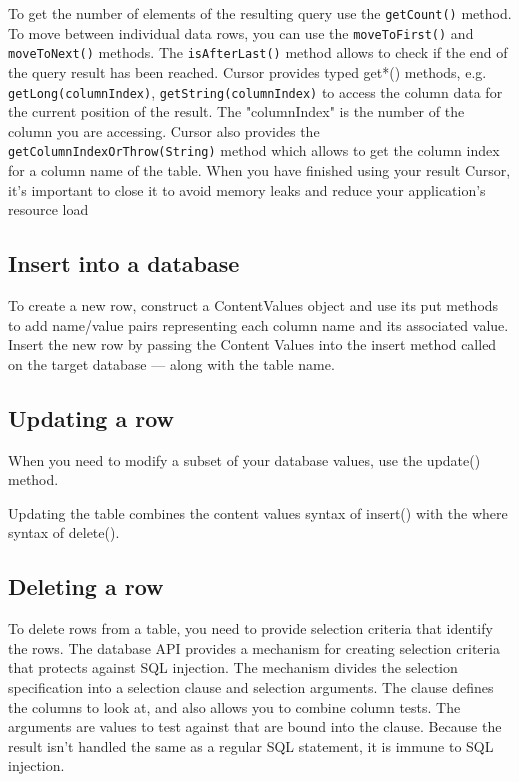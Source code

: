 To get the number of elements of the resulting query use the \texttt{getCount()} method.
To move between individual data rows, you can use the \texttt{moveToFirst()} and \texttt{moveToNext()} methods. The \texttt{isAfterLast()} method allows to check if the end of the query result has been reached.
Cursor provides typed get*() methods, e.g. \texttt{getLong(columnIndex)}, \texttt{getString(columnIndex)} to access the column data for the current position of the result. The "columnIndex" is the number of the column you are accessing.
Cursor also provides the \texttt{getColumnIndexOrThrow(String)} method which allows to get the column index for a column name of the table.
When you have finished using your result Cursor, it’s important to close it to avoid memory leaks and reduce your application’s resource load

\subsection{Insert into a database}
To create a new row, construct a ContentValues object and use its put methods to add name/value pairs representing each column name and its associated value. Insert the new row by passing the Content Values into the insert method called on the target database — along with the table name.

\subsection{Updating a row}
When you need to modify a subset of your database values, use the update() method.

Updating the table combines the content values syntax of insert() with the where syntax of delete().

\subsection{Deleting a row}
To delete rows from a table, you need to provide selection criteria that identify the rows. The database API provides a mechanism for creating selection criteria that protects against SQL injection. The mechanism divides the selection specification into a selection clause and selection arguments. The clause defines the columns to look at, and also allows you to combine column tests. The arguments are values to test against that are bound into the clause. Because the result isn't handled the same as a regular SQL statement, it is immune to SQL injection.

